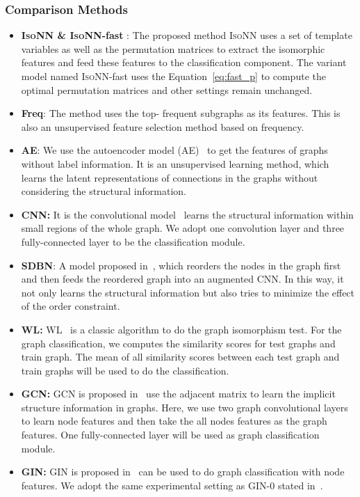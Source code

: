 \documentclass{article} \usepackage{iclr2020_conference,times}
\newcommand{\our}{\textsc{IsoNN}}
\newcommand{\ourfast}{\textsc{IsoNN}-fast}
\begin{document}
\subsubsection{Comparison Methods}
\begin{itemize}
	\item \textbf{{\our} \& {\ourfast} }: The proposed method {\our} uses a set of template variables as well as the permutation matrices to extract the isomorphic features and feed these features to the classification component. The variant model named  {\ourfast} uses the Equation~\ref{eq:fast_p} to compute the optimal permutation matrices and other settings remain unchanged. 
	
	\item \textbf{Freq}: The method uses the top- frequent subgraphs as its features. This is also an unsupervised feature selection method based on frequency. 
	
	\item \textbf{AE}: We use the autoencoder model (AE)~\citet{vincent2010stacked} to get the features of graphs without label information. It is an unsupervised learning method, which learns the latent representations of connections in the graphs without considering the structural information.
	
	\item \textbf{CNN:} It is the convolutional model~\citet{krizhevsky2012imagenet} learns the structural information within small regions of the whole graph. We adopt one convolution layer and three fully-connected layer to be the classification module.
	
	\item \textbf{SDBN}: A model proposed in~\citet{wang2017structural}, which reorders the nodes in the graph first and then feeds the reordered graph into an augmented CNN. In this way, it not only learns the structural information but also tries to minimize the effect of the order constraint.
	
	
	\item \textbf{WL:}  WL~\cite{shervashidze2009fast} is a classic algorithm to do the graph  isomorphism test. For the graph classification, we computes the similarity scores for test graphs and train graph. The mean of all similarity scores between each test graph and train graphs will be used to do the classification.
	\item  \textbf{GCN:} GCN is proposed in~\cite{kipf2016semi} use the adjacent matrix to learn the implicit structure information in graphs. Here, we use two graph convolutional layers to learn node features and then take the all nodes features as the graph features. One fully-connected layer will be used as graph classification module. 
	 \item  \textbf{GIN:}  GIN is proposed in~\cite{xu2018powerful} can be used to do graph classification with node features. We adopt the same experimental setting as  GIN-0 stated in~\cite{xu2018powerful}. 
	 
	
	 
\end{itemize}
\vspace*{-10pt}
\end{document}
